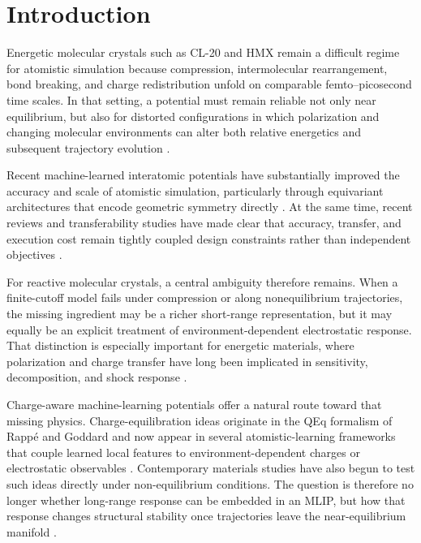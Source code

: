 \section{Introduction}
Energetic molecular crystals such as CL-20 and HMX remain a difficult regime for atomistic simulation because compression, intermolecular rearrangement, bond breaking, and charge redistribution unfold on comparable femto--picosecond time scales. In that setting, a potential must remain reliable not only near equilibrium, but also for distorted configurations in which polarization and changing molecular environments can alter both relative energetics and subsequent trajectory evolution \cite{valeeswaran2023charge,menikoff2016shock,bolton2008molecular}.

Recent machine-learned interatomic potentials have substantially improved the accuracy and scale of atomistic simulation, particularly through equivariant architectures that encode geometric symmetry directly \cite{batatia2022mace,batzner20223,musaelian2023learning,liao2023equiformer,batatia2023foundation}. At the same time, recent reviews and transferability studies have made clear that accuracy, transfer, and execution cost remain tightly coupled design constraints rather than independent objectives \cite{musil2021physics,unke2021machine,goedecker2023perspective,jacobs2025practical,huang2025cross}.

For reactive molecular crystals, a central ambiguity therefore remains. When a finite-cutoff model fails under compression or along nonequilibrium trajectories, the missing ingredient may be a richer short-range representation, but it may equally be an explicit treatment of environment-dependent electrostatic response. That distinction is especially important for energetic materials, where polarization and charge transfer have long been implicated in sensitivity, decomposition, and shock response \cite{valeeswaran2023charge,van2001reaxff}.

Charge-aware machine-learning potentials offer a natural route toward that missing physics. Charge-equilibration ideas originate in the QEq formalism of Rapp\'e and Goddard \cite{rappe1991charge} and now appear in several atomistic-learning frameworks that couple learned local features to environment-dependent charges or electrostatic observables \cite{gastegger2017machine,unke2019physnet,ko2021fourth,fuchs2025celli}. Contemporary materials studies have also begun to test such ideas directly under non-equilibrium conditions. The question is therefore no longer whether long-range response can be embedded in an MLIP, but how that response changes structural stability once trajectories leave the near-equilibrium manifold \cite{jung2026charge}.

